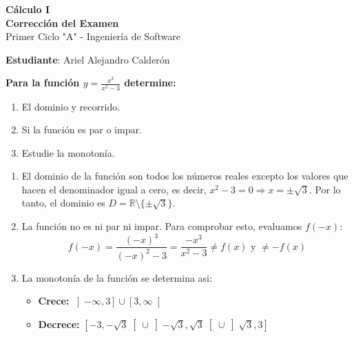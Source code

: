 \documentclass[answers]{exam}
\begin{document}
\begin{center}
	\Large\textbf{Cálculo I}\\[1em]
	\large\textbf{Corrección del Examen}\\[1em]
	\large Primer Ciclo "A" - Ingeniería de Software\\[1em]
\end{center}

\vspace{0.5cm}
\large\textbf{Estudiante}: Ariel Alejandro Calderón
\vspace{0.5cm}

\begin{questions}

	\question \large\textbf{Para la función $\displaystyle y = \frac{x^3}{x^2 - 3} $ determine:}
	\begin{enumerate}[label=\alph*.]
		\item El dominio y recorrido.
		\item Si la función es par o impar.
		\item Estudie la monotonía.
	\end{enumerate}
	\begin{solution}
		\begin{enumerate}[label=\alph*.]
			\item El dominio de la función son todos los números reales excepto los valores que hacen el denominador igual a cero, es decir, $x^2 - 3 = 0 \Rightarrow x = \pm\sqrt{3}$. Por lo tanto, el dominio es $D = \mathbb{R} \setminus \{\pm\sqrt{3}\}$.

			\item La función no es ni par ni impar. Para comprobar esto, evaluamos $f(-x)$:
			      \[
				      f(-x) = \frac{(-x)^3}{(-x)^2 - 3} = \frac{-x^3}{x^2 - 3} \neq f(x) \text{ y } \neq -f(x)
			      \]

			\item La monotonía de la función se determina asi:
			      \begin{itemize}
				      \item \normalsize\textbf{Crece:} $\displaystyle
					            \left]-\infty, 3\right]\cup \left[3, \infty\right[
				            $
				      \item \normalsize\textbf{Decrece:} $\displaystyle
					            \left[-3, -\sqrt{3}\right[\cup \left]-\sqrt{3}, \sqrt{3}\right[\cup \left]\sqrt{3}, 3\right]
				            $
			      \end{itemize}
		\end{enumerate}
		\vspace{0.5cm}



\end{solution}
\end{questions}
\end{document}
